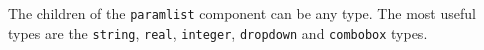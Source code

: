 The children of the \verb=paramlist= component can be any type. The most useful
types are the \verb=string=, \verb=real=, \verb=integer=, \verb=dropdown= and
\verb=combobox= types.



